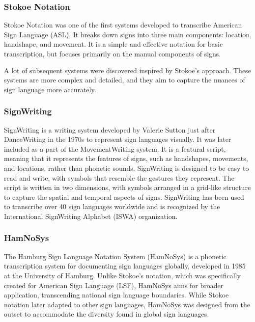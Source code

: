 \documentclass[../../main.tex]{subfiles}
\begin{document}
\subsubsection{Stokoe Notation}

Stokoe Notation\cite{TODO} was one of the first systems developed to transcribe American Sign Language (ASL). It breaks down signs into three main components: location, handshape, and movement. It is a simple and effective notation for basic transcription, but focuses primarily on the manual components of signs.

A lot of subsequent systems were discovered inspired by Stokoe's approach. These systems are more complex and detailed, and they aim to capture the nuances of sign language more accurately.

\subsubsection{SignWriting}

SignWriting is a writing system developed by Valerie Sutton just after DanceWriting\cite{TODO} in the 1970s to represent sign languages visually. It was later included as a part of the MovementWriting\cite{TODO} system. It is a featural script, meaning that it represents the features of signs, such as handshapes, movements, and locations, rather than phonetic sounds. SignWriting is designed to be easy to read and write, with symbols that resemble the gestures they represent. The script is written in two dimensions, with symbols arranged in a grid-like structure to capture the spatial and temporal aspects of signs. SignWriting has been used to transcribe over 40 sign languages worldwide and is recognized by the International SignWriting Alphabet (ISWA) organization.


\subsubsection{HamNoSys}

The Hamburg Sign Language Notation System (HamNoSys) is a phonetic transcription system for documenting sign languages globally, developed in 1985 at the University of Hamburg. Unlike Stokoe's notation, which was specifically created for American Sign Language (LSF), HamNoSys aims for broader application, transcending national sign language boundaries. While Stokoe notation later adapted to other sign languages, HamNoSys was designed from the outset to accommodate the diversity found in global sign languages.
\end{document}
